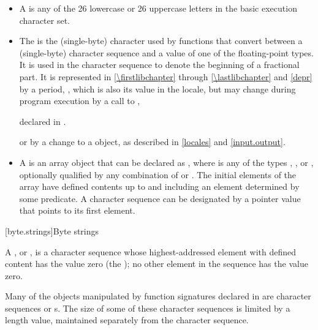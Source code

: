 \begin{itemize}
\item
A  is any of the 26 lowercase or 26
%
%
uppercase letters in the basic execution character set.
\item
The
is the
(single-byte) character used by functions that convert between a (single-byte)
character sequence and a value of one of the floating-point types.
It is used
in the character sequence to denote the beginning of a fractional part.
It is
represented in \ref{\firstlibchapter} through \ref{\lastlibchapter}
and \ref{depr} by a period,
%
,
which is
also its value in the 
locale, but may change during program
execution by a call to
,
\begin{footnote}
declared in
.
%
\end{footnote}
or by a change to a
object, as described in \ref{locales} and \ref{input.output}.
\item
A
is an array object  that
can be declared as
,
where  is any of the types
,
,
or
, optionally qualified by any combination of
or
.
The initial elements of the
array have defined contents up to and including an element determined by some
predicate.
A character sequence can be designated by a pointer value
 that points to its first element.
\end{itemize}

[byte.strings]{Byte strings}

%
\pnum
A ,
or \ntbs{},
is a character sequence whose highest-addressed element
with defined content has the value zero
(the );
no other element in the sequence has the value zero.
\begin{footnote}
Many of the objects manipulated by
function signatures declared in
 are character sequences or \ntbs{}s.
The size of some of these character sequences is limited by
a length value, maintained separately from the character sequence.
\end{footnote}

